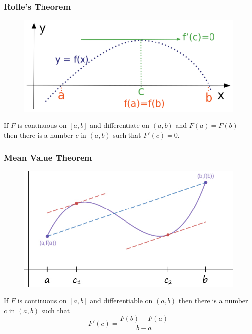 \documentclass{beamer}
\begin{document}
\begin{frame}
\frametitle{\textbf{Rolle's Theorem}}
\begin{figure}
	\centering
	\includegraphics[height=.4\textheight]{rolles.png}\\
	\hspace*{10pt}\hbox{}
\end{figure}

\begin{theorem}
	If $F$ is continuous on $[a,b]$ and differentiate on $(a,b)$ and $F(a)=F(b)$ then there is a number $c$ in $(a,b)$ such that $F'(c)=0$.
\end{theorem}
\end{frame}

\begin{frame}
\frametitle{\textbf{Mean Value Theorem}}
\begin{figure}
	\centering
	\includegraphics[height=.35\textheight]{meanvalue.jpg}\\
	\hspace*{10pt}\hbox{}
\end{figure}
\begin{theorem}
	If $F$ is continuous on $[a,b]$ and differentiable on $(a,b)$ then there is a number $c$ in $(a,b)$ such that
	$$F'(c) = \frac{F(b)-F(a)}{b-a}$$
\end{theorem}
\end{frame}
\end{document}
